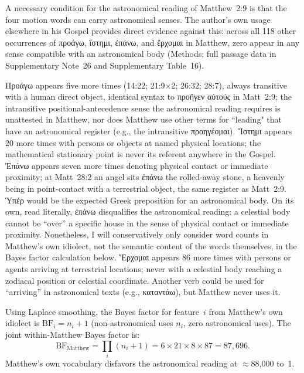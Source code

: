 \documentclass[sn-nature]{sn-jnl}
\newcommand{\grk}[1]{{\fontencoding{LGR}\selectfont #1}}
\newcommand{\grk}[1]{{\greekfont #1}}
\begin{document}
A necessary condition for the astronomical reading of Matthew~2:9 is that the
four motion words can carry astronomical senses. The author's own usage
elsewhere in his Gospel provides direct evidence against this: across all 118
other occurrences of \grk{προάγω}, \grk{ἵστημι}, \grk{ἐπάνω}, and
\grk{ἔρχομαι} in Matthew, zero appear in any sense compatible with an
astronomical body (Methods; full passage data in Supplementary Note~26 and Supplementary Table~16).

\grk{Προάγω} appears five more times (14:22; 21:9$\times$2; 26:32; 28:7),
always transitive with a human direct object, identical syntax to
\grk{προῆγεν αὐτούς} in Matt~2:9; the intransitive positional-antecedence
sense the astronomical reading requires is unattested in Matthew, nor does 
Matthew use other terms for ``leading" that have an astronomical register 
(e.g., the intransitive \grk{προηγέομαι}).
\grk{Ἵστημι} appears 20 more times with persons or objects at named physical
locations; the mathematical stationary point is never its referent anywhere in
the Gospel.
\grk{Ἐπάνω} appears seven more times denoting physical contact or immediate
proximity; at Matt~28:2 an angel sits \grk{ἐπάνω} the rolled-away stone, a
heavenly being in point-contact with a terrestrial object, the same register
as Matt~2:9. \grk{Ὑπέρ} would be the expected Greek preposition for an astronomical body. 
On its own, read literally, \grk{ἐπάνω} disqualifies the astronomical 
reading: a celestial body cannot be ``over'' a specific house in the sense of physical 
contact or immediate proximity. Nonetheless, I will conservatively only consider word 
counts in Matthew's own idiolect, not the semantic content of the words themselves, 
in the Bayes factor calculation below.
\grk{Ἔρχομαι} appears 86 more times with persons or agents
arriving at terrestrial locations; never with a celestial body reaching a
zodiacal position or celestial coordinate. Another verb could be used for ``arriving'' 
in astronomical texts (e.g., \grk{καταντάω}), but Matthew never uses it.

Using Laplace smoothing, the Bayes factor for feature~$i$ from Matthew's own
idiolect is $\mathrm{BF}_i = n_i + 1$ (non-astronomical uses $n_i$, zero
astronomical uses). The joint within-Matthew Bayes factor is:
\begin{equation}
  \mathrm{BF}_\text{Matthew}
    = \prod_i (n_i + 1)
    = 6 \times 21 \times 8 \times 87
    = 87{,}696.
  \label{eq:bf_matthew_main}
\end{equation}
Matthew's own vocabulary disfavors the astronomical reading at $\approx$88{,}000 to~1.
\end{document}
